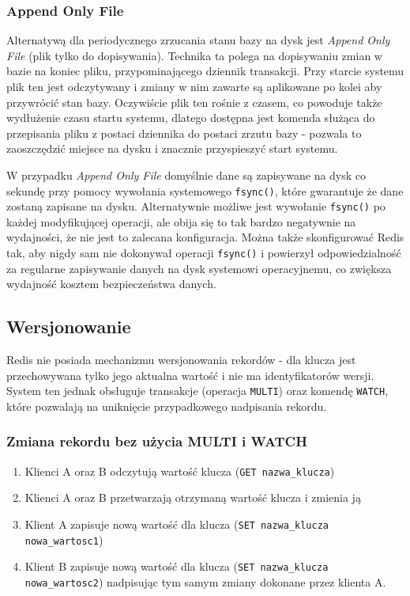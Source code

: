 \subsubsection*{Append Only File}

Alternatywą dla periodycznego zrzucania stanu bazy na dysk jest \emph{Append Only File} (plik tylko do dopisywania).
Technika ta polega na dopisywaniu zmian w bazie na koniec pliku, przypominającego dziennik transakcji.
Przy starcie systemu plik ten jest odczytywany i zmiany w nim zawarte są aplikowane po kolei aby przywrócić stan bazy.
Oczywiście plik ten rośnie z czasem, co powoduje także wydłużenie czasu startu systemu, dlatego dostępna jest komenda służąca do przepisania pliku z postaci dziennika do postaci zrzutu bazy - pozwala to zaoszczędzić miejsce na dysku i znacznie przyspieszyć start systemu.

W przypadku \emph{Append Only File} domyślnie dane są zapisywane na dysk co sekundę przy pomocy wywołania systemowego \verb+fsync()+, które gwarantuje że dane zostaną zapisane na dysku.
Alternatywnie możliwe jest wywołanie \verb+fsync()+ po każdej modyfikującej operacji, ale obija się to tak bardzo negatywnie na wydajności, że nie jest to zalecana konfiguracja.
Można także skonfigurować Redis tak, aby nigdy sam nie dokonywał operacji \verb+fsync()+ i powierzył odpowiedzialność za regularne zapisywanie danych na dysk systemowi operacyjnemu, co zwiększa wydajność kosztem bezpieczeństwa danych.

\subsection*{Wersjonowanie}

Redis nie posiada mechanizmu wersjonowania rekordów - dla klucza jest przechowywana tylko jego aktualna wartość i nie ma identyfikatorów wersji.
System ten jednak obsługuje transakcje (operacja \verb+MULTI+) oraz komendę \verb+WATCH+, które pozwalają na uniknięcie przypadkowego nadpisania rekordu.

\subsubsection*{Zmiana rekordu bez użycia MULTI i WATCH}

\begin{enumerate}
 \item Klienci A oraz B odczytują wartość klucza (\verb+GET nazwa_klucza+)
 \item Klienci A oraz B przetwarzają otrzymaną wartość klucza i zmienia ją
 \item Klient A zapisuje nową wartość dla klucza (\verb+SET nazwa_klucza nowa_wartosc1+)
 \item Klient B zapisuje nową wartość dla klucza (\verb+SET nazwa_klucza nowa_wartosc2+) nadpisując tym samym zmiany dokonane przez klienta A.
\end{enumerate}


